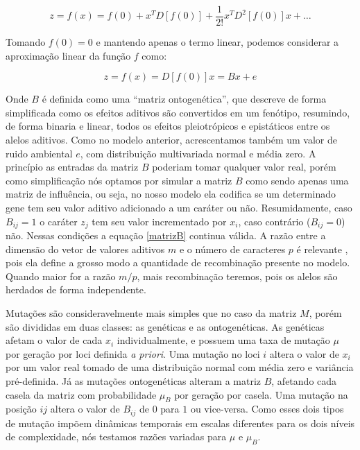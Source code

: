 \begin{equation}
z = f(x) = f(0) + x^T D[f(0)] + \frac{1}{2!} x^T D^2 [f(0)] x + \ldots
\end{equation}

Tomando $f(0) = 0$ e mantendo apenas o termo linear, podemos considerar
a aproximação linear da função $f$ como:

\begin{equation}
z = f(x) = D[f(0)]x = Bx + e
\label{matrizB}
\end{equation}

Onde $B$ é definida como uma ``matriz ontogenética'', que descreve de
forma simplificada como os efeitos aditivos são convertidos em um
fenótipo, resumindo, de forma binaria e linear, todos os efeitos
pleiotrópicos e epistáticos entre os alelos aditivos.
Como no modelo anterior, acrescentamos também um valor de ruido
ambiental $e$, com distribuição multivariada normal e média zero.
A princípio as entradas da matriz $B$ poderiam tomar qualquer valor
real, porém como simplificação nós optamos por simular a matriz $B$ como
sendo apenas uma matriz de influência, ou seja, no nosso modelo ela
codifica se um determinado gene tem seu valor aditivo adicionado a um
caráter ou não.
Resumidamente, caso $B_{ij} = 1$ o caráter $z_j$ tem seu valor
incrementado por $x_i$, caso contrário ($B_{ij} = 0$) não.
Nessas condições a equação \ref{matrizB} continua válida.
A razão entre a dimensão do vetor de valores aditivos $m$ e o número de
caracteres $p$ é relevante \citep{Wagner1984}, pois ela define a grosso modo
a quantidade de recombinação presente no modelo.
Quando maior for a razão $m/p$, mais recombinação teremos, pois os
alelos são herdados de forma independente.

Mutações são consideravelmente mais simples que no caso da
matriz $M$, porém são divididas em duas classes: as genéticas e as
ontogenéticas.
As genéticas afetam o valor de cada $x_i$ individualmente, e possuem uma
taxa de mutação $\mu$ por geração por loci definida {\it a priori}.
Uma mutação no loci $i$ altera o valor de $x_i$ por um valor real tomado
de uma distribuição normal com média zero e variância pré-definida.
Já as mutações ontogenéticas alteram a matriz $B$, afetando cada casela
da matriz com probabilidade $\mu_B$ por geração por casela.
Uma mutação na posição $ij$ altera o valor de $B_{ij}$ de $0$ para $1$
ou vice-versa.
Como esses dois tipos de mutação impõem dinâmicas temporais em escalas
diferentes para os dois níveis de complexidade, nós testamos razões
variadas para $\mu$ e $\mu_B$.

